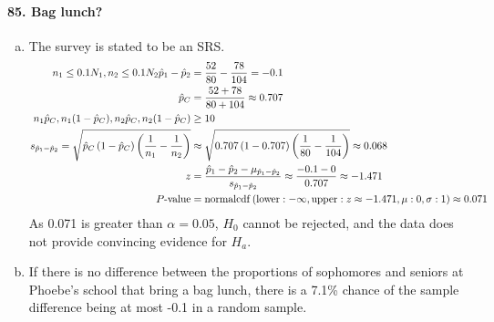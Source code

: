 			\paragraph{85. Bag lunch?}
				\begin{enumerate}[a.]
					\item
						The survey is stated to be an SRS.
						\begin{align*}
							n_1 \le 0.1N_1, n_2 \le 0.1N_2
							\hat{p}_1 - \hat{p}_2 &= \frac{52}{80} - \frac{78}{104} = -0.1 \\
							\hat{p}_C &= \frac{52 + 78}{80 + 104} \approx 0.707 \\
							n_1\hat{p}_C, n_1(1 - \hat{p}_C), n_2\hat{p}_C, n_2(1 - \hat{p}_C) &\ge 10\\
							s_{\hat{p}_1 - \hat{p}_2} = \sqrt{\hat{p}_C\left(1 - \hat{p}_C\right)\left(\frac{1}{n_1} - \frac{1}{n_2}\right)} &\approx \sqrt{0.707\left(1 - 0.707\right)\left(\frac{1}{80} - \frac{1}{104}\right)} \approx 0.068 \\
							z &= \frac{\hat{p}_1 - \hat{p}_2 - \mu_{\hat{p}_1 - \hat{p}_2}}{s_{\hat{p}_1 - \hat{p}_2}} \approx \frac{-0.1 - 0}{0.707} \approx -1.471 \\
							P\text{-value} &= \operatorname{normalcdf}\left(\operatorname{lower}: -\infty, \operatorname{upper}: z \approx -1.471, \mu: 0, \sigma: 1\right) \approx 0.071
						\end{align*}
						As 0.071 is greater than $\alpha = 0.05$, $H_0$ cannot be rejected, and the data does not provide convincing evidence for $H_a$.
					\item
						If there is no difference between the proportions of sophomores and seniors at Phoebe's school that bring a bag lunch, there is a 7.1\% chance of the sample difference being at most -0.1 in a random sample.
				\end{enumerate}
